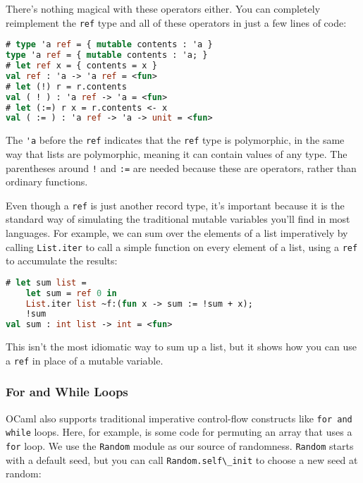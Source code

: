 There's nothing magical with these operators either. You can completely
reimplement the \passthrough{\lstinline!ref!} type and all of these
operators in just a few lines of code:

\begin{lstlisting}[language=Caml]
# type 'a ref = { mutable contents : 'a }
type 'a ref = { mutable contents : 'a; }
# let ref x = { contents = x }
val ref : 'a -> 'a ref = <fun>
# let (!) r = r.contents
val ( ! ) : 'a ref -> 'a = <fun>
# let (:=) r x = r.contents <- x
val ( := ) : 'a ref -> 'a -> unit = <fun>
\end{lstlisting}

The \passthrough{\lstinline!'a!} before the
\passthrough{\lstinline!ref!} indicates that the
\passthrough{\lstinline!ref!} type is polymorphic, in the same way that
lists are polymorphic, meaning it can contain values of any type. The
parentheses around \passthrough{\lstinline"!"} and
\passthrough{\lstinline!:=!} are needed because these are operators,
rather than ordinary functions.

Even though a \passthrough{\lstinline!ref!} is just another record type,
it's important because it is the standard way of simulating the
traditional mutable variables you'll find in most languages. For
example, we can sum over the elements of a list imperatively by calling
\passthrough{\lstinline!List.iter!} to call a simple function on every
element of a list, using a \passthrough{\lstinline!ref!} to accumulate
the results:

\begin{lstlisting}[language=Caml]
# let sum list =
    let sum = ref 0 in
    List.iter list ~f:(fun x -> sum := !sum + x);
    !sum
val sum : int list -> int = <fun>
\end{lstlisting}

This isn't the most idiomatic way to sum up a list, but it shows how you
can use a \passthrough{\lstinline!ref!} in place of a mutable variable.

\hypertarget{for-and-while-loops}{%
\subsubsection{For and While Loops}\label{for-and-while-loops}}

OCaml also supports traditional imperative control-flow constructs like
\passthrough{\lstinline!for and while!} loops. Here, for example, is
some code for permuting an array that uses a
\passthrough{\lstinline!for!} loop. We use the
\passthrough{\lstinline!Random!} module as our source of randomness.
\passthrough{\lstinline!Random!} starts with a default seed, but you can
call \passthrough{\lstinline!Random.self\_init!} to choose a new seed at
random:

